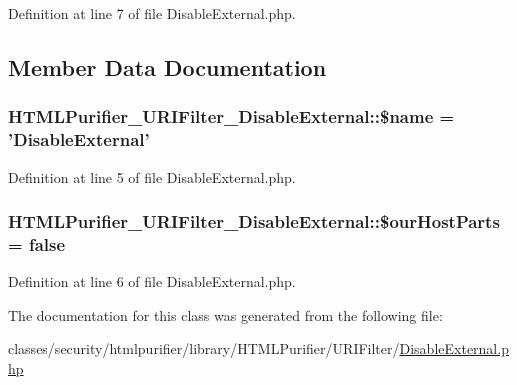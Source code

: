 Definition at line 7 of file Disable\+External.\+php.



\subsection{Member Data Documentation}
\hypertarget{classHTMLPurifier__URIFilter__DisableExternal_ad3995a91603ac1f0f69c70cafa823481}{
\subsubsection[{\$name}]{\setlength{\rightskip}{0pt plus 5cm}H\+T\+M\+L\+Purifier\+\_\+\+U\+R\+I\+Filter\+\_\+\+Disable\+External\+::\$name = 'Disable\+External'}}\label{classHTMLPurifier__URIFilter__DisableExternal_ad3995a91603ac1f0f69c70cafa823481}


Definition at line 5 of file Disable\+External.\+php.

\hypertarget{classHTMLPurifier__URIFilter__DisableExternal_af6a300b222528c011e2908fc2398552b}{
\subsubsection[{\$our\+Host\+Parts}]{\setlength{\rightskip}{0pt plus 5cm}H\+T\+M\+L\+Purifier\+\_\+\+U\+R\+I\+Filter\+\_\+\+Disable\+External\+::\$our\+Host\+Parts = false\hspace{0.3cm}{\ttfamily [protected]}}}\label{classHTMLPurifier__URIFilter__DisableExternal_af6a300b222528c011e2908fc2398552b}


Definition at line 6 of file Disable\+External.\+php.



The documentation for this class was generated from the following file\+:\begin{DoxyCompactItemize}
\item 
classes/security/htmlpurifier/library/\+H\+T\+M\+L\+Purifier/\+U\+R\+I\+Filter/\hyperlink{DisableExternal_8php}{Disable\+External.\+php}\end{DoxyCompactItemize}
